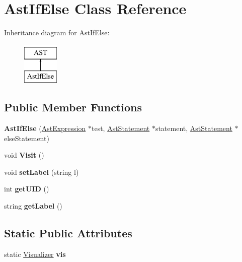 \hypertarget{classAstIfElse}{\section{Ast\-If\-Else Class Reference}
\label{classAstIfElse}
}
Inheritance diagram for Ast\-If\-Else\-:\begin{figure}[H]
\begin{center}
\leavevmode
\includegraphics[height=2.000000cm]{classAstIfElse}
\end{center}
\end{figure}
\subsection*{Public Member Functions}
\begin{DoxyCompactItemize}
\item 
\hypertarget{classAstIfElse_aac4a0ab9c36999fdd491ef5fe6c1e68c}{{\bfseries Ast\-If\-Else} (\hyperlink{classAstExpression}{Ast\-Expression} $\ast$test, \hyperlink{classAstStatement}{Ast\-Statement} $\ast$statement, \hyperlink{classAstStatement}{Ast\-Statement} $\ast$else\-Statement)}\label{classAstIfElse_aac4a0ab9c36999fdd491ef5fe6c1e68c}

\item 
\hypertarget{classAstIfElse_a4c038fd5b0cb99ea75f9847d96f65c32}{void {\bfseries Visit} ()}\label{classAstIfElse_a4c038fd5b0cb99ea75f9847d96f65c32}

\item 
\hypertarget{classAST_a71d680856e95ff89f55d5311a552eba6}{void {\bfseries set\-Label} (string l)}\label{classAST_a71d680856e95ff89f55d5311a552eba6}

\item 
\hypertarget{classAST_ab7a5b1d9f1c2de0d98deb356f724a42c}{int {\bfseries get\-U\-I\-D} ()}\label{classAST_ab7a5b1d9f1c2de0d98deb356f724a42c}

\item 
\hypertarget{classAST_aee029be902fffc927d16ccb03eb922ad}{string {\bfseries get\-Label} ()}\label{classAST_aee029be902fffc927d16ccb03eb922ad}

\end{DoxyCompactItemize}
\subsection*{Static Public Attributes}
\begin{DoxyCompactItemize}
\item 
\hypertarget{classAST_aca9e6637209b31e03a09c0d42f29bdfa}{static \hyperlink{classVisualizer}{Visualizer} {\bfseries vis}}\label{classAST_aca9e6637209b31e03a09c0d42f29bdfa}

\end{DoxyCompactItemize}
